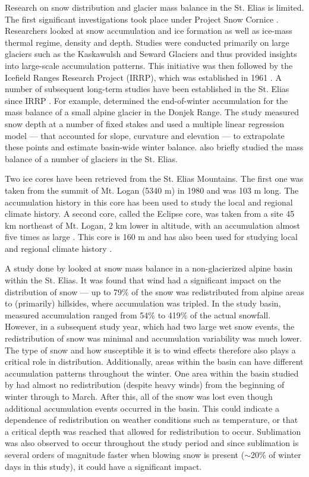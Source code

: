 \documentclass{sfuthesis}
\begin{document}
Research on snow distribution and glacier mass balance in the St. Elias is limited. The first significant investigations took place under Project Snow Cornice \citep{Wood1948}. Researchers looked at snow accumulation and ice formation as well as ice-mass thermal regime, density and depth. Studies were conducted primarily on large glaciers such as the Kaskawulsh and Seward Glaciers and thus provided insights into large-scale accumulation patterns. This initiative was then followed by the Icefield Ranges Research Project (IRRP), which was established in 1961 \citep{Danby2003}. A number of subsequent long-term studies have been established in the St. Elias since IRRP \citep[e.g.][]{Clarke1984, Paoli2009}. For example, \cite{Wheler2014} determined the end-of-winter accumulation for the mass balance of a small alpine glacier in the Donjek Range. The study measured snow depth at a number of fixed stakes and used a multiple linear regression model --- that accounted for slope, curvature and elevation --- to extrapolate these points and estimate basin-wide winter balance. \cite{Arendt2008} also briefly studied the mass balance of a number of glaciers in the St. Elias.

Two ice cores have been retrieved from the St. Elias Mountains. The first one was taken from the summit of Mt. Logan (5340 m) in 1980 and was 103 m long. The accumulation history in this core has been used to study the local \citep{Holdsworth1991} and regional \citep{Moore2002} climate history. A second core, called the Eclipse core, was taken from a site 45 km northeast of Mt. Logan, 2 km lower in altitude, with an accumulation almost five times as large \citep{Wake2002}. This core is 160 m and has also been used for studying local and regional climate history \citep{Wake2002}. 

A study done by \cite{Pomeroy1999} looked at snow mass balance in a non-glacierized alpine basin within the St. Elias. It was found that wind had a significant impact on the distribution of snow --- up to 79$\%$ of the snow was redistributed from alpine areas to (primarily) hillsides, where accumulation was tripled. In the study basin, measured accumulation ranged from 54$\%$ to 419$\%$ of the actual snowfall. However, in a subsequent study year, which had two large wet snow events, the redistribution of snow was minimal and accumulation variability was much lower. The type of snow and how susceptible it is to wind effects therefore also plays a critical role in distribution. Additionally, areas within the basin can have different accumulation patterns throughout the winter. One area within the basin studied by \cite{Pomeroy1999} had almost no redistribution (despite heavy winds) from the beginning of winter through to March. After this, all of the snow was lost even though additional accumulation events occurred in the basin. This could indicate a dependence of redistribution on weather conditions such as temperature, or that a critical depth was reached that allowed for redistribution to occur. Sublimation was also observed to occur throughout the study period and since sublimation is several orders of magnitude faster when blowing snow is present ($\sim$20\% of winter days in this study), it could have a significant impact.
\end{document}
